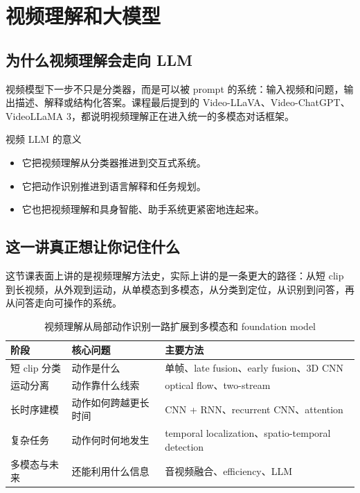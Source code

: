 \documentclass[a4paper]{article}
\begin{document}
\section{视频理解和大模型}

\subsection{为什么视频理解会走向 LLM}

视频模型下一步不只是分类器，而是可以被 prompt 的系统：输入视频和问题，输出描述、解释或结构化答案。课程最后提到的 Video-LLaVA、Video-ChatGPT、VideoLLaMA 3，都说明视频理解正在进入统一的多模态对话框架。

\begin{importantbox}{视频 LLM 的意义}
\begin{itemize}
    \item 它把视频理解从分类器推进到交互式系统。
\item 它把动作识别推进到语言解释和任务规划。
    \item 它也把视频理解和具身智能、助手系统更紧密地连起来。
\end{itemize}
\end{importantbox}

\subsection{这一讲真正想让你记住什么}

这节课表面上讲的是视频理解方法史，实际上讲的是一条更大的路径：从短 clip 到长视频，从外观到运动，从单模态到多模态，从分类到定位，从识别到问答，再从问答走向可操作的系统。

\begin{table}[H]
\centering
\begin{tabular}{p{3.1cm}p{3.4cm}p{4.8cm}}
\toprule
\textbf{阶段} & \textbf{核心问题} & \textbf{主要方法} \\
\midrule
短 clip 分类 & 动作是什么 & 单帧、late fusion、early fusion、3D CNN \\
运动分离 & 动作靠什么线索 & optical flow、two-stream \\
长时序建模 & 动作如何跨越更长时间 & CNN + RNN、recurrent CNN、attention \\
复杂任务 & 动作何时何地发生 & temporal localization、spatio-temporal detection \\
多模态与未来 & 还能利用什么信息 & 音视频融合、efficiency、LLM \\
\bottomrule
\end{tabular}
\caption{视频理解从局部动作识别一路扩展到多模态和 foundation model}
\end{table}
\end{document}
